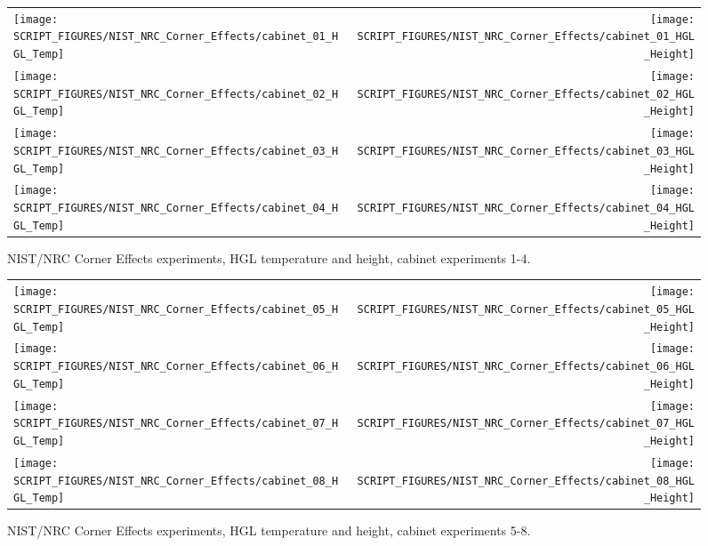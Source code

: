 \begin{figure}[p]
\begin{tabular*}{\textwidth}{l@{\extracolsep{\fill}}r}
\texttt{[image: SCRIPT\_FIGURES/NIST\_NRC\_Corner\_Effects/cabinet\_01\_HGL\_Temp]} &
\texttt{[image: SCRIPT\_FIGURES/NIST\_NRC\_Corner\_Effects/cabinet\_01\_HGL\_Height]} \\
\texttt{[image: SCRIPT\_FIGURES/NIST\_NRC\_Corner\_Effects/cabinet\_02\_HGL\_Temp]} &
\texttt{[image: SCRIPT\_FIGURES/NIST\_NRC\_Corner\_Effects/cabinet\_02\_HGL\_Height]} \\
\texttt{[image: SCRIPT\_FIGURES/NIST\_NRC\_Corner\_Effects/cabinet\_03\_HGL\_Temp]} &
\texttt{[image: SCRIPT\_FIGURES/NIST\_NRC\_Corner\_Effects/cabinet\_03\_HGL\_Height]} \\
\texttt{[image: SCRIPT\_FIGURES/NIST\_NRC\_Corner\_Effects/cabinet\_04\_HGL\_Temp]} &
\texttt{[image: SCRIPT\_FIGURES/NIST\_NRC\_Corner\_Effects/cabinet\_04\_HGL\_Height]}
\end{tabular*}
\caption[NIST/NRC Corner Effects, HGL temperature and height, cabinet experiments 1-4]
{NIST/NRC Corner Effects experiments, HGL temperature and height, cabinet experiments 1-4.}
\label{NIST_NRC_Cabinet_1}
\end{figure}

\begin{figure}[p]
\begin{tabular*}{\textwidth}{l@{\extracolsep{\fill}}r}

\texttt{[image: SCRIPT\_FIGURES/NIST\_NRC\_Corner\_Effects/cabinet\_05\_HGL\_Temp]} &
\texttt{[image: SCRIPT\_FIGURES/NIST\_NRC\_Corner\_Effects/cabinet\_05\_HGL\_Height]} \\
\texttt{[image: SCRIPT\_FIGURES/NIST\_NRC\_Corner\_Effects/cabinet\_06\_HGL\_Temp]} &
\texttt{[image: SCRIPT\_FIGURES/NIST\_NRC\_Corner\_Effects/cabinet\_06\_HGL\_Height]} \\
\texttt{[image: SCRIPT\_FIGURES/NIST\_NRC\_Corner\_Effects/cabinet\_07\_HGL\_Temp]} &
\texttt{[image: SCRIPT\_FIGURES/NIST\_NRC\_Corner\_Effects/cabinet\_07\_HGL\_Height]} \\
\texttt{[image: SCRIPT\_FIGURES/NIST\_NRC\_Corner\_Effects/cabinet\_08\_HGL\_Temp]} &
\texttt{[image: SCRIPT\_FIGURES/NIST\_NRC\_Corner\_Effects/cabinet\_08\_HGL\_Height]}
\end{tabular*}
\caption[NIST/NRC Corner Effects, HGL temperature and height, cabinet experiments 5-8]
{NIST/NRC Corner Effects experiments, HGL temperature and height, cabinet experiments 5-8.}
\label{NIST_NRC_Cabinet_2}
\end{figure}

